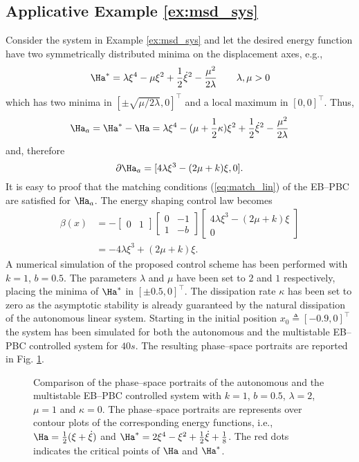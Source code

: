 \subsection{Applicative Example \ref{ex:msd_sys}}
%
Consider the system in Example \ref{ex:msd_sys} and let the desired energy function have two symmetrically distributed minima on the displacement axes, e.g.,
\[\Ha^* = \lambda\xi^4-\mu\xi^2 + \frac{1}{2}\dot{\xi}^2- \frac{\mu^2}{2\lambda}\qquad\lambda,\mu>0\]
which has two minima in $[\pm\sqrt{\mu/2\lambda},0]^\top$ and a local maximum in $[0,0]^\top$. Thus, 
\[\Ha_a = \Ha^* - \Ha = \lambda\xi^4-(\mu+\frac{1}{2}\kappa)\xi^2 + \frac{1}{2}\dot{\xi}^2- \frac{\mu^2}{2\lambda}\]
and, therefore
\[\partial\Ha_a = [4\lambda\xi^3-(2\mu + k)\xi,0].\]
It is easy to proof that the matching conditions (\ref{eq:match_lin}) of the EB--PBC are satisfied for $\Ha_a$. The energy shaping control law becomes
%
\begin{align}\label{eq:ex_ctrl}
    \beta(x) &= -\begin{bmatrix}0&1\end{bmatrix}\begin{bmatrix}0&-1\\1&-b\end{bmatrix}\begin{bmatrix}4\lambda\xi^3-(2\mu + k)\xi\\0\end{bmatrix}\nonumber\\
             &= -4\lambda\xi^3+(2\mu + k)\xi.
\end{align}
%
A numerical simulation of the proposed control scheme has been performed with $k = 1$, $b = 0.5$. The parameters $\lambda$ and $\mu$ have been set to $2$ and $1$ respectively, placing the minima of $\Ha^*$ in $[\pm0.5,0]^\top$. The dissipation rate $\kappa$ has been set to zero as the asymptotic stability is already guaranteed by the natural dissipation of the autonomous linear system. Starting in the initial position $x_0 \triangleq [-0.9,0]^\top$ the system has been simulated for both the  autonomous and the multistable EB--PBC controlled system for $40s$. The resulting phase--space portraits are reported in Fig. \ref{fig:ctrl_ps}.
%
\begin{figure}[b]
    \centering
    
    \caption{Comparison of the phase--space portraits of the autonomous and the multistable EB--PBC controlled system with $k = 1$, $b = 0.5$, $\lambda = 2$, $\mu = 1$ and $\kappa = 0$. The phase--space portraits are represents over contour plots of the corresponding energy functions, i.e., $\Ha = \frac{1}{2}(\xi + \dot{\xi})$ and  $\Ha^* =  2\xi^4 - \xi^2 + \frac{1}{2}\dot{\xi} + \frac{1}{8}$. The red dots indicates the critical points of $\Ha$ and $\Ha^*$.}
    \label{fig:ctrl_ps}
\end{figure}
